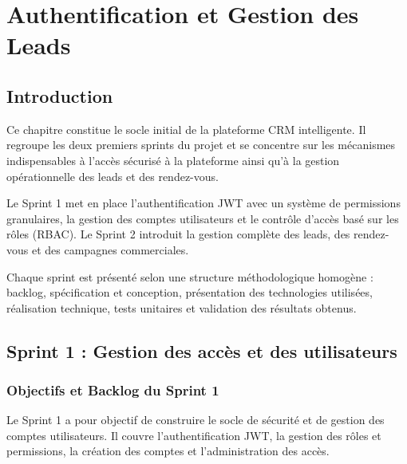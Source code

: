 \chapter[Authentification et Gestion des Leads]{Authentification et Gestion des Leads}
\label{chap:release1}

\section*{Introduction}
\label{sec:chap4_introduction}

Ce chapitre constitue le socle initial de la plateforme CRM intelligente. Il regroupe les deux
premiers sprints du projet et se concentre sur les mécanismes indispensables à l'accès sécurisé
à la plateforme ainsi qu'à la gestion opérationnelle des leads et des rendez-vous.

Le Sprint 1 met en place l'authentification JWT avec un système de permissions granulaires,
la gestion des comptes utilisateurs et le contrôle d'accès basé sur les rôles (RBAC). Le
Sprint 2 introduit la gestion complète des leads, des rendez-vous et des campagnes
commerciales.

Chaque sprint est présenté selon une structure méthodologique homogène : backlog, spécification
et conception, présentation des technologies utilisées, réalisation technique, tests unitaires
et validation des résultats obtenus.

\section[Sprint 1 : Accès et utilisateurs]{Sprint 1 : Gestion des accès et des utilisateurs}
\label{sec:sprint1}

\subsection{Objectifs et Backlog du Sprint 1}
\label{subsec:sprint1_backlog}

Le Sprint 1 a pour objectif de construire le socle de sécurité et de gestion des comptes
utilisateurs. Il couvre l'authentification JWT, la gestion des rôles et permissions, la
création des comptes et l'administration des accès.

